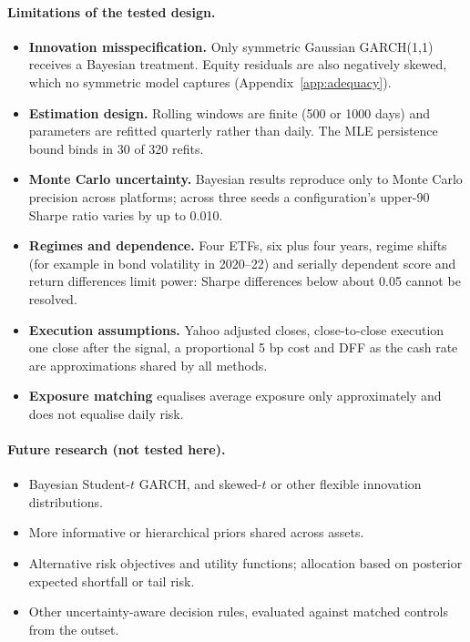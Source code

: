 \documentclass[11pt]{article}
\begin{document}
\paragraph{Limitations of the tested design.}
\begin{itemize}
\item \textbf{Innovation misspecification.} Only symmetric Gaussian GARCH(1,1) receives a Bayesian treatment. Equity
residuals are also negatively skewed, which no symmetric model captures (Appendix~\ref{app:adequacy}).
\item \textbf{Estimation design.} Rolling windows are finite (500 or 1000 days) and parameters are refitted quarterly
rather than daily. The MLE persistence bound binds in 30 of 320 refits.
\item \textbf{Monte Carlo uncertainty.} Bayesian results reproduce only to Monte Carlo precision across platforms;
across three seeds a configuration's upper-90 Sharpe ratio varies by up to 0.010.
\item \textbf{Regimes and dependence.} Four ETFs, six plus four years, regime shifts (for example in bond volatility
in 2020--22) and serially dependent score and return differences limit power: Sharpe differences below about 0.05
cannot be resolved.
\item \textbf{Execution assumptions.} Yahoo adjusted closes, close-to-close execution one close after the signal, a
proportional 5 bp cost and DFF as the cash rate are approximations shared by all methods.
\item \textbf{Exposure matching} equalises average exposure only approximately and does not equalise daily risk.
\end{itemize}

\paragraph{Future research (not tested here).}
\begin{itemize}
\item Bayesian Student-$t$ GARCH, and skewed-$t$ or other flexible innovation distributions.
\item More informative or hierarchical priors shared across assets.
\item Alternative risk objectives and utility functions; allocation based on posterior expected shortfall or tail risk.
\item Other uncertainty-aware decision rules, evaluated against matched controls from the outset.
\end{itemize}
\end{document}

